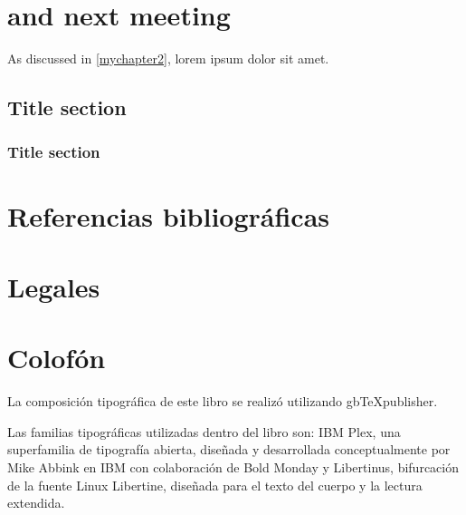 \documentclass{book}
\begin{document}
\lipsum[1]

\chapter{and next meeting}
As discussed in \ref{mychapter2}, lorem ipsum dolor sit amet.

\lipsum[2]

\section{Title section}

\lipsum[3]

\subsection{Title section}

\lipsum[1]

\backmatter

\chapter{Referencias bibliográficas}
\printbibliography[heading=none]

\chapter{Legales}

\lipsum[4]

\chapter{Colofón}

La composición tipográfica de este libro se realizó utilizando gbTeXpublisher.

Las familias tipográficas utilizadas dentro del libro son: IBM Plex, una superfamilia de tipografía abierta, diseñada y desarrollada conceptualmente por Mike Abbink en IBM con colaboración de Bold Monday y Libertinus, bifurcación de la fuente Linux Libertine, diseñada para el texto del cuerpo y la lectura extendida.
\end{document}
